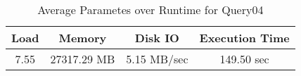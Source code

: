 \documentclass[../../main.tex]{subfiles}
\begin{document}
    \begin{table}
        \begin{center}
            \begin{tabular}{ |c|c|c|c| } 
            \hline
            Load & Memory & Disk IO & Execution Time\\
            \hline
            7.55 & 27317.29 MB & 5.15 MB/sec & 149.50 sec \\
            \hline
            \end{tabular}
            \\[1pt]
            \caption{Average Parametes over Runtime for Query04}
        \end{center}
    \end{table}
    \pagebreak
\end{document}
